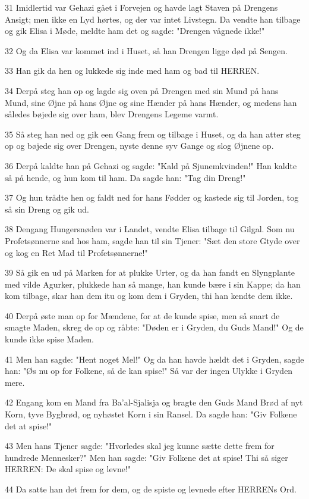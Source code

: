 \par 31 Imidlertid var Gehazi gået i Forvejen og havde lagt Staven på Drengens Ansigt; men ikke en Lyd hørtes, og der var intet Livstegn. Da vendte han tilbage og gik Elisa i Møde, meldte ham det og sagde: "Drengen vågnede ikke!"
\par 32 Og da Elisa var kommet ind i Huset, så han Drengen ligge død på Sengen.
\par 33 Han gik da hen og lukkede sig inde med ham og bad til HERREN.
\par 34 Derpå steg han op og lagde sig oven på Drengen med sin Mund på hans Mund, sine Øjne på hans Øjne og sine Hænder på hans Hænder, og medens han således bøjede sig over ham, blev Drengens Legeme varmt.
\par 35 Så steg han ned og gik een Gang frem og tilbage i Huset, og da han atter steg op og bøjede sig over Drengen, nyste denne syv Gange og slog Øjnene op.
\par 36 Derpå kaldte han på Gehazi og sagde: "Kald på Sjunemkvinden!" Han kaldte så på hende, og hun kom til ham. Da sagde han: "Tag din Dreng!"
\par 37 Og hun trådte hen og faldt ned for hans Fødder og kastede sig til Jorden, tog så sin Dreng og gik ud.
\par 38 Dengang Hungersnøden var i Landet, vendte Elisa tilbage til Gilgal. Som nu Profetsønnerne sad hos ham, sagde han til sin Tjener: "Sæt den store Gtyde over og kog en Ret Mad til Profetsønnerne!"
\par 39 Så gik en ud på Marken for at plukke Urter, og da han fandt en Slyngplante med vilde Agurker, plukkede han så mange, han kunde bære i sin Kappe; da han kom tilbage, skar han dem itu og kom dem i Gryden, thi han kendte dem ikke.
\par 40 Derpå øste man op for Mændene, for at de kunde spise, men så snart de smagte Maden, skreg de op og råbte: "Døden er i Gryden, du Guds Mand!" Og de kunde ikke spise Maden.
\par 41 Men han sagde: "Hent noget Mel!" Og da han havde hældt det i Gryden, sagde han: "Øs nu op for Folkene, så de kan spise!" Så var der ingen Ulykke i Gryden mere.
\par 42 Engang kom en Mand fra Ba'al-Sjalisja og bragte den Guds Mand Brød af nyt Korn, tyve Bygbrød, og nyhøstet Korn i sin Ransel. Da sagde han: "Giv Folkene det at spise!"
\par 43 Men hans Tjener sagde: "Hvorledes skal jeg kunne sætte dette frem for hundrede Mennesker?" Men han sagde: "Giv Folkene det at spise! Thi så siger HERREN: De skal spise og levne!"
\par 44 Da satte han det frem for dem, og de spiste og levnede efter HERRENs Ord.

